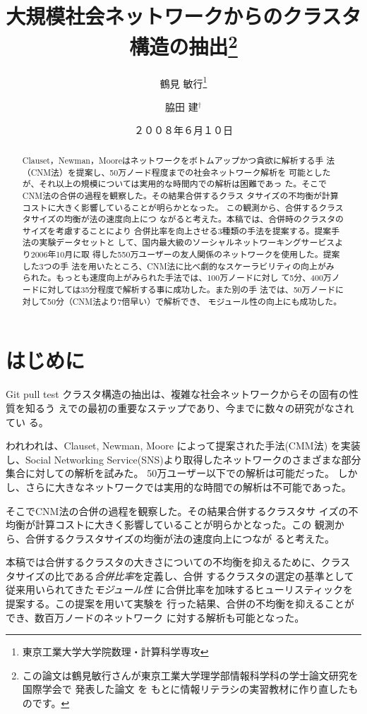 \documentclass [a4j,11pt] {jsarticle}
\title  {大規模社会ネットワークからのクラスタ構造の抽出\thanks {
  この論文は鶴見敏行さんが東京工業大学理学部情報科学科の学士論文研究を国際学会で
  発表した論文 \protect\cite {wakita-2007-finding-community-structure-in-mega-scale-social}を
  もとに情報リテラシの実習教材に作り直したものです。}}
\author {鶴見 敏行\thanks {東京工業大学大学院数理・計算科学専攻} \and 脇田 建{$^\dagger$}}
\date {２００８年６月１０日}
\begin{document}
\maketitle


\begin {abstract}
Clauset，Newman，Mooreはネットワークをボトムアップかつ貪欲に解析する手
法（CNM法）を提案し、50万ノード程度までの社会ネットワーク解析を
可能としたが、それ以上の規模については実用的な時間内での解析は困難であっ
た。そこでCNM法の合併の過程を観察した。その結果合併するクラス
タサイズの不均衡が計算コストに大きく影響していることが明らかとなった。
この観測から、合併するクラスタサイズの均衡が法の速度向上につ
ながると考えた。本稿では、合併時のクラスタのサイズを考慮することにより
合併比率を向上させる3種類の手法を提案する。提案手法の実験データセットと
して、国内最大級のソーシャルネットワーキングサービスより2006年10月に取
得した550万ユーザーの友人関係のネットワークを使用した。提案した3つの手
法を用いたところ、CNM法に比べ劇的なスケーラビリティの向上がみ
られた。もっとも速度向上がみられた手法では、100万ノードに対し
て5分、400万ノードに対しては35分程度で解析する事に成功した。また別の手
法では、50万ノードに対して50分（CNM法より7倍早い）で解析でき、
モジュール性の向上にも成功した。
\end {abstract}

\section {はじめに}
\label {sect: はじめに}

Git pull test
クラスタ構造の抽出は、複雑な社会ネットワークからその固有の性質を知るう
えでの最初の重要なステップであり、今までに数々の研究がなされてい
る。
\cite{Kleinberg99,
  Page99,
  Dean99,
  Kumar99,
  Miller01,
  Toyoda01,
  Wu04,
  Cai04,
  Clauset04,
  Onsjo06}


われわれは、Clauset, Newman, Moore によって提案された手法(CMM法)
\cite{Clauset04}
を実装し、Social Networking Service(SNS)より取得したネットワークのさまざまな部分集合に対しての解析を試みた。
50万ユーザー以下での解析は可能だった。
しかし、さらに大きなネットワークでは実用的な時間での解析は不可能であった。

そこでCNM法の合併の過程を観察した。その結果合併するクラスタサ
イズの不均衡が計算コストに大きく影響していることが明らかとなった。この
観測から、合併するクラスタサイズの均衡が法の速度向上につなが
ると考えた。

本稿では合併するクラスタの大きさについての不均衡を抑えるために、クラス
タサイズの比である\emph {合併比率}を定義し、合併
するクラスタの選定の基準として従来用いられてきた{\em モジュール性}
に合併比率を加味するヒューリスティックを提案する。この提案を用いて実験を
行った結果、合併の不均衡を抑えることができ、数百万ノードのネットワーク
に対する解析も可能となった。
\end{document}

